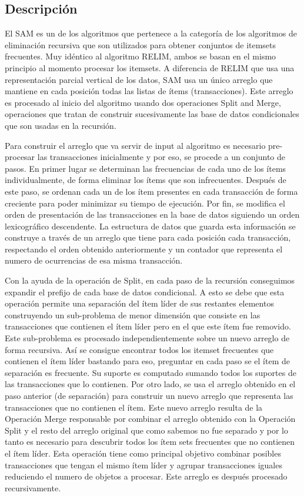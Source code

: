 \documentclass[12pt,spanish]{article}
\begin{document}
\subsection{Descripci\'on}
El SAM es un de los algoritmos que pertenece a la categoría de los algoritmos de eliminación recursiva que son utilizados para obtener conjuntos de itemsets frecuentes. Muy idéntico al algoritmo RELIM,  ambos se basan en el mismo principio al momento procesar los itemsets. A diferencia de RELIM que usa una representación parcial vertical de los datos, SAM usa un único arreglo que mantiene en cada posición todas las listas de ítems (transacciones). Este arreglo es procesado al inicio del algoritmo usando dos operaciones Split and Merge, operaciones que tratan de construir sucesivamente las base de datos condicionales que son usadas en la recursión.

Para construir el arreglo que va servir de input al algoritmo es necesario pre-procesar las transacciones inicialmente y por eso, se procede a un conjunto de pasos. En primer lugar se determinan las frecuencias de cada uno de los ítems individualmente, de forma eliminar los ítems que son infrecuentes. Después de este paso, se ordenan cada un de los ítem presentes en cada transacción de forma creciente para poder minimizar su tiempo de ejecución. Por fin, se  modifica el orden de presentación de las transacciones en la base de datos siguiendo un orden lexicográfico descendente. La estructura de datos que guarda esta información se construye a través de un arreglo que tiene para cada posición cada transacción, respectando el orden obtenido anteriormente y un contador que representa el numero de ocurrencias de esa misma transacción.

Con la ayuda de la operación de Split, en cada paso de la recursión conseguimos expandir el prefijo de cada base de datos condicional. A esto se debe que esta operación permite una separación del ítem líder de sus restantes elementos construyendo un sub-problema de menor dimensión que consiste en las transacciones que contienen el ítem líder pero en el que este ítem fue removido. Este sub-problema es procesado independientemente sobre un nuevo arreglo de forma recursiva. Así se consigue encontrar todos los itemset frecuentes que contienen el ítem líder bastando para eso, preguntar en cada paso se el ítem de separación es frecuente. Su suporte es computado sumando todos los suportes de las transacciones que lo contienen. 
Por otro lado, se usa el arreglo obtenido en el paso anterior (de separación)  para construir un nuevo arreglo que representa las transacciones que no contienen el ítem. Este nuevo arreglo  resulta de la Operación Merge responsable por combinar el arreglo obtenido con la Operación Split y el resto del arreglo original que como sabemos no fue separado y por lo tanto es necesario para descubrir todos los ítem sets frecuentes que no contienen el ítem líder. Esta operación tiene como principal objetivo combinar posibles transacciones que tengan el mismo ítem líder y agrupar transacciones iguales reduciendo el numero de objetos a procesar. Este arreglo es después procesado recursivamente.
\end{document}
